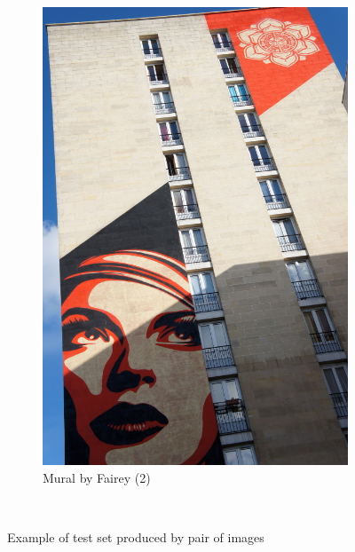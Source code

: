 \documentclass{article}
\begin{document}
\begin{figure}
{\begin{subfigure}[t]{0.50\textwidth}
			\centering
			\includegraphics[width=\textwidth]{images/pair_example2}
			\caption{Mural by Fairey (2)}
			\label{fig:fairey2}
		\end{subfigure}%
	}%
	\\
	\label{fig:fairey}
	\caption{Example of test set produced by pair of images}
\end{figure}
\end{document}
